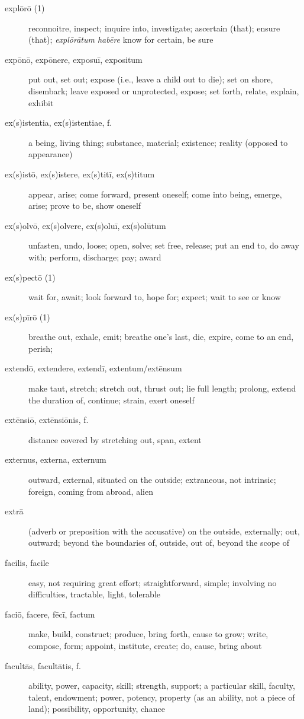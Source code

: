 \begin{description}
    \item[explōrō (1)] reconnoitre, inspect; inquire into, investigate; ascertain (that); ensure (that); \textit{explōrātum habēre} know for certain, be sure
    \item[expōnō, expōnere, exposuī, expositum] put out, set out; expose (i.e., leave a child out to die); set on shore, disembark; leave exposed or unprotected, expose; set forth, relate, explain, exhibit
    \item[ex(s)istentia, ex(s)istentiae, f.] a being, living thing; substance, material; existence; reality (opposed to appearance)
    \item[ex(s)istō, ex(s)istere, ex(s)titī, ex(s)titum] appear, arise; come forward, present oneself; come into being, emerge, arise; prove to be, show oneself
    \item[ex(s)olvō, ex(s)olvere, ex(s)oluī, ex(s)olūtum] unfasten, undo, loose; open, solve; set free, release; put an end to, do away with; perform, discharge; pay; award
    \item[ex(s)pectō (1)] wait for, await; look forward to, hope for; expect; wait to see or know
    \item[ex(s)pīrō (1)] breathe out, exhale, emit; breathe one's last, die, expire, come to an end, perish;
    \item[extendō, extendere, extendī, extentum/extēnsum] make taut, stretch; stretch out, thrust out; lie full length; prolong, extend the duration of, continue; strain, exert oneself
    \item[extēnsiō, extēnsiōnis, f.] distance covered by stretching out, span, extent
    \item[externus, externa, externum] outward, external, situated on the outside; extraneous, not intrinsic; foreign, coming from abroad, alien
    \item[extrā] \marginnote{*}(adverb or preposition with the accusative) on the outside, externally; out, outward; beyond the boundaries of, outside, out of, beyond the scope of
    \item[facilis, facile] \marginnote{*}easy, not requiring great effort; straightforward, simple; involving no difficulties, tractable, light, tolerable
    \item[faciō, facere, fēcī, factum] \marginnote{*}make, build, construct; produce, bring forth, cause to grow; write, compose, form; appoint, institute, create; do, cause, bring about
    \item[facultās, facultātis, f.] ability, power, capacity, skill; strength, support; a particular skill, faculty, talent, endowment; power, potency, property (as an ability, not a piece of land); possibility, opportunity, chance

\end{description}

